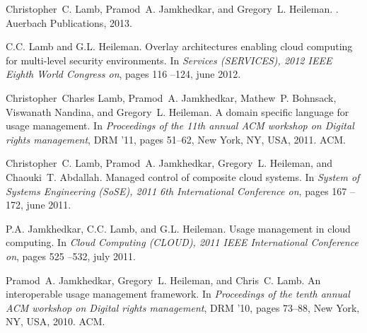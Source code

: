 \documentclass[margin,line]{resume}
\begin{document}
\begin{resume}
Christopher~C. Lamb, Pramod~A. Jamkhedkar, and Gregory~L. Heileman.
.
\newblock Auerbach Publications, 2013.

C.C. Lamb and G.L. Heileman.
\newblock Overlay architectures enabling cloud computing for multi-level
  security environments.
\newblock In {\em Services (SERVICES), 2012 IEEE Eighth World Congress on},
  pages 116 --124, june 2012.

\newpage

Christopher~Charles Lamb, Pramod~A. Jamkhedkar, Mathew~P. Bohnsack, Viswanath
  Nandina, and Gregory~L. Heileman.
\newblock A domain specific language for usage management.
\newblock In {\em Proceedings of the 11th annual ACM workshop on Digital rights
  management}, DRM '11, pages 51--62, New York, NY, USA, 2011. ACM.

Christopher~C. Lamb, Pramod~A. Jamkhedkar, Gregory~L. Heileman, and Chaouki~T.
  Abdallah.
\newblock Managed control of composite cloud systems.
\newblock In {\em System of Systems Engineering (SoSE), 2011 6th International
  Conference on}, pages 167 --172, june 2011.

P.A. Jamkhedkar, C.C. Lamb, and G.L. Heileman.
\newblock Usage management in cloud computing.
\newblock In {\em Cloud Computing (CLOUD), 2011 IEEE International Conference
  on}, pages 525 --532, july 2011.

Pramod~A. Jamkhedkar, Gregory~L. Heileman, and Chris~C. Lamb.
\newblock An interoperable usage management framework.
\newblock In {\em Proceedings of the tenth annual ACM workshop on Digital
  rights management}, DRM '10, pages 73--88, New York, NY, USA, 2010. ACM.

\end{resume}
\end{document}
